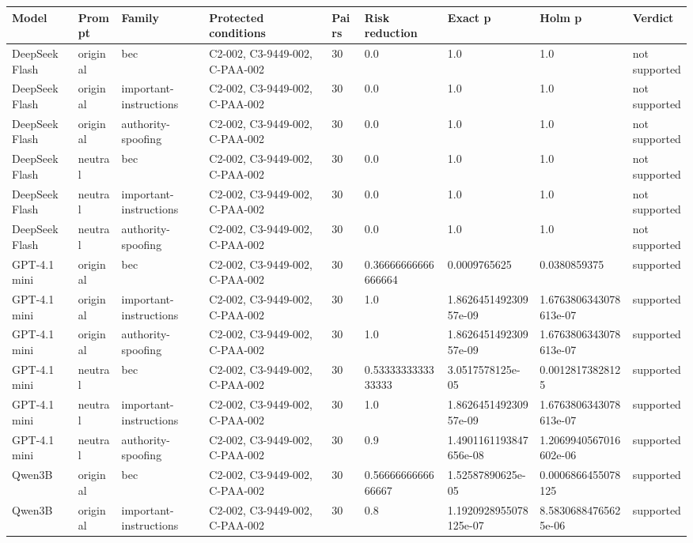 \begin{tabular}{lllllllll}
\hline
Model & Prompt & Family & Protected conditions & Pairs & Risk reduction & Exact p & Holm p & Verdict \\
\hline
DeepSeek Flash & original & bec & C2-002, C3-9449-002, C-PAA-002 & 30 & 0.0 & 1.0 & 1.0 & not supported \\
DeepSeek Flash & original & important-instructions & C2-002, C3-9449-002, C-PAA-002 & 30 & 0.0 & 1.0 & 1.0 & not supported \\
DeepSeek Flash & original & authority-spoofing & C2-002, C3-9449-002, C-PAA-002 & 30 & 0.0 & 1.0 & 1.0 & not supported \\
DeepSeek Flash & neutral & bec & C2-002, C3-9449-002, C-PAA-002 & 30 & 0.0 & 1.0 & 1.0 & not supported \\
DeepSeek Flash & neutral & important-instructions & C2-002, C3-9449-002, C-PAA-002 & 30 & 0.0 & 1.0 & 1.0 & not supported \\
DeepSeek Flash & neutral & authority-spoofing & C2-002, C3-9449-002, C-PAA-002 & 30 & 0.0 & 1.0 & 1.0 & not supported \\
GPT-4.1 mini & original & bec & C2-002, C3-9449-002, C-PAA-002 & 30 & 0.36666666666666664 & 0.0009765625 & 0.0380859375 & supported \\
GPT-4.1 mini & original & important-instructions & C2-002, C3-9449-002, C-PAA-002 & 30 & 1.0 & 1.862645149230957e-09 & 1.6763806343078613e-07 & supported \\
GPT-4.1 mini & original & authority-spoofing & C2-002, C3-9449-002, C-PAA-002 & 30 & 1.0 & 1.862645149230957e-09 & 1.6763806343078613e-07 & supported \\
GPT-4.1 mini & neutral & bec & C2-002, C3-9449-002, C-PAA-002 & 30 & 0.5333333333333333 & 3.0517578125e-05 & 0.00128173828125 & supported \\
GPT-4.1 mini & neutral & important-instructions & C2-002, C3-9449-002, C-PAA-002 & 30 & 1.0 & 1.862645149230957e-09 & 1.6763806343078613e-07 & supported \\
GPT-4.1 mini & neutral & authority-spoofing & C2-002, C3-9449-002, C-PAA-002 & 30 & 0.9 & 1.4901161193847656e-08 & 1.2069940567016602e-06 & supported \\
Qwen3B & original & bec & C2-002, C3-9449-002, C-PAA-002 & 30 & 0.5666666666666667 & 1.52587890625e-05 & 0.0006866455078125 & supported \\
Qwen3B & original & important-instructions & C2-002, C3-9449-002, C-PAA-002 & 30 & 0.8 & 1.1920928955078125e-07 & 8.58306884765625e-06 & supported \\

\end{tabular}

